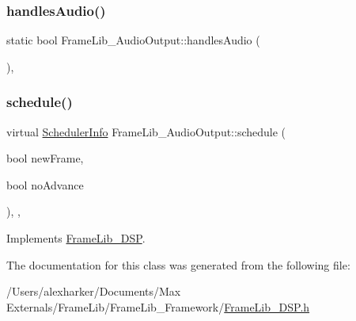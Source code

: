 \subsubsection{\texorpdfstring{handles\+Audio()}{handlesAudio()}}
{\footnotesize\ttfamily static bool Frame\+Lib\+\_\+\+Audio\+Output\+::handles\+Audio (\begin{DoxyParamCaption}{ }\end{DoxyParamCaption})\hspace{0.3cm}{\ttfamily [inline]}, {\ttfamily [static]}}

\mbox{\label{class_frame_lib___audio_output_a39e97cc3e92147465cf1f6c267de185d}} 
\subsubsection{\texorpdfstring{schedule()}{schedule()}}
{\footnotesize\ttfamily virtual \hyperlink{struct_frame_lib___d_s_p_1_1_scheduler_info}{Scheduler\+Info} Frame\+Lib\+\_\+\+Audio\+Output\+::schedule (\begin{DoxyParamCaption}\item[{bool}]{new\+Frame,  }\item[{bool}]{no\+Advance }\end{DoxyParamCaption})\hspace{0.3cm}{\ttfamily [inline]}, {\ttfamily [protected]}, {\ttfamily [virtual]}}



Implements \hyperlink{class_frame_lib___d_s_p}{Frame\+Lib\+\_\+\+D\+SP}.



The documentation for this class was generated from the following file\+:\begin{DoxyCompactItemize}
\item 
/\+Users/alexharker/\+Documents/\+Max Externals/\+Frame\+Lib/\+Frame\+Lib\+\_\+\+Framework/\hyperlink{_frame_lib___d_s_p_8h}{Frame\+Lib\+\_\+\+D\+S\+P.\+h}\end{DoxyCompactItemize}
